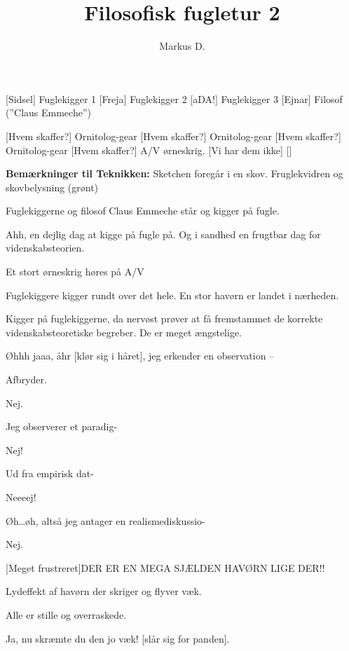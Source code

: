 \documentclass[a4paper,12pt]{article}
\title{Filosofisk fugletur 2}
\author{Markus D.}
\begin{document}
\maketitle




\begin{roles}
	[Sidsel] Fuglekigger 1
	[Freja] Fuglekigger 2
	[aDA!] Fuglekigger 3
	[Ejnar] Filosof (''Claus Emmeche'')
\end{roles}


\begin{props}
	[Hvem skaffer?] Ornitolog-gear
	[Hvem skaffer?] Ornitolog-gear
	[Hvem skaffer?] Ornitolog-gear
	[Hvem skaffer?] A/V ørneskrig.
	 [Vi har dem ikke]
\end{props}

\begin{sketch}



\scene \textbf{Bemærkninger til Teknikken:}
Sketchen foregår i en skov. Fruglekvidren og skovbelysning (grønt)



\scene Fuglekiggerne og filosof Claus Emmeche står og kigger på fugle. 

Ahh, en dejlig dag at kigge på fugle på. Og i sandhed en frugtbar dag for videnskabsteorien.

Et stort ørneskrig høres på A/V

\scene Fuglekiggere kigger rundt over det hele. En stor havørn er landet i nærheden.

\scene Kigger på fuglekiggerne, da nervøst prøver at få fremstammet de korrekte videnskabsteoretiske begreber. De er meget ængstelige.

Øhhh jaaa, åhr [klør sig i håret], jeg erkender en observation -- 

Afbryder.

Nej.

Jeg observerer et paradig-

Nej!

Ud fra empirisk dat-

Neeeej!


Øh\ldots øh, altså jeg antager en realismediskussio-

Nej.

[Meget frustreret]DER ER EN MEGA SJÆLDEN HAVØRN LIGE DER!!

Lydeffekt af havørn der skriger og flyver væk.

\scene Alle er stille og overraskede.

Ja, nu skræmte du den jo væk! [slår sig for panden].



\end{sketch}
\end{document}
